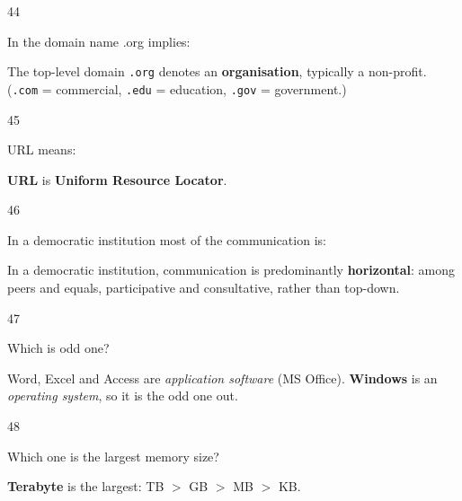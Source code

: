 \begin{question}{44}
{In the domain name .org implies:\par}
\begin{explain}
The top-level domain \texttt{.org} denotes an \textbf{organisation}, typically a non-profit. (\texttt{.com} = commercial, \texttt{.edu} = education, \texttt{.gov} = government.)
\end{explain}
\end{question}

\begin{question}{45}
{URL means:\par}
\begin{explain}
\textbf{URL} is \textbf{Uniform Resource Locator}.
\end{explain}
\end{question}

\begin{question}{46}
{In a democratic institution most of the communication is:\par}
\begin{explain}
In a democratic institution, communication is predominantly \textbf{horizontal}: among peers and equals, participative and consultative, rather than top-down.
\end{explain}
\end{question}

\begin{question}{47}
{Which is odd one?\par}
\begin{explain}
Word, Excel and Access are \emph{application software} (MS Office). \textbf{Windows} is an \emph{operating system}, so it is the odd one out.
\end{explain}
\end{question}

\begin{question}{48}
{Which one is the largest memory size?\par}
\begin{explain}
\textbf{Terabyte} is the largest: TB $>$ GB $>$ MB $>$ KB.
\end{explain}
\end{question}

